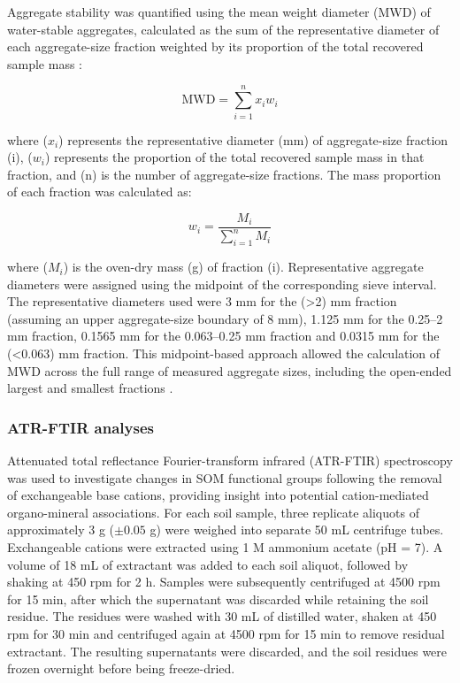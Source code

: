 \documentclass[preprint,12pt]{elsarticle}
\begin{document}
Aggregate stability was quantified using the mean weight diameter (MWD) of water-stable aggregates, calculated as the sum of the representative diameter of each aggregate-size fraction weighted by its proportion of the total recovered sample mass \citep{Abiven2009,KemperRosenau2018,Franzluebbers2022,Jimenez2025}:

\begin{equation}
    \mathrm{MWD} =
    \sum_{i=1}^{n} x_i w_i
    \label{eq:mwd}
\end{equation}
  
where ($x_i$) represents the representative diameter (mm) of aggregate-size fraction (i), ($w_i$) represents the proportion of the total recovered sample mass in that fraction, and (n) is the number of aggregate-size fractions. The mass proportion of each fraction was calculated as:
  
\begin{equation}
    w_i =
    \frac{M_i}{\sum_{i=1}^{n} M_i}
    \label{eq:mass_proportion}
\end{equation}

where ($M_i$) is the oven-dry mass (g) of fraction (i). Representative aggregate diameters were assigned using the midpoint of the corresponding sieve interval. The representative diameters used were 3 mm for the (>2) mm fraction (assuming an upper aggregate-size boundary of 8 mm), 1.125 mm for the 0.25--2 mm fraction, 0.1565 mm for the 0.063--0.25 mm fraction and 0.0315 mm for the (<0.063) mm fraction. This midpoint-based approach allowed the calculation of MWD across the full range of measured aggregate sizes, including the open-ended largest and smallest fractions \citep{Franzluebbers2022,Jimenez2025}.

\subsubsection{ATR-FTIR analyses}

Attenuated total reflectance Fourier-transform infrared (ATR-FTIR) spectroscopy was used to investigate changes in SOM functional groups following the removal of exchangeable base cations, providing insight into potential cation-mediated organo-mineral associations. For each soil sample, three replicate aliquots of approximately 3 g ($\pm 0.05$ g) were weighed into separate 50 mL centrifuge tubes. Exchangeable cations were extracted using 1 M ammonium acetate (pH = 7). A volume of 18 mL of extractant was added to each soil aliquot, followed by shaking at 450 rpm for 2 h. Samples were subsequently centrifuged at 4500 rpm for 15 min, after which the supernatant was discarded while retaining the soil residue. The residues were washed with 30 mL of distilled water, shaken at 450 rpm for 30 min and centrifuged again at 4500 rpm for 15 min to remove residual extractant. The resulting supernatants were discarded, and the soil residues were frozen overnight before being freeze-dried.
\end{document}
